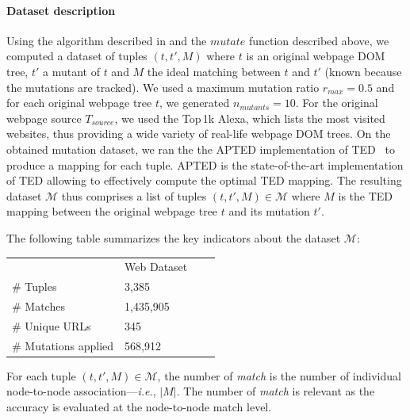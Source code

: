 \documentclass{vldb}
\begin{document}
\paragraph{Dataset description}
Using the algorithm described in  and the $mutate$ function described above, we computed a dataset of tuples $(t, t', M)$ where $t$ is an original webpage DOM tree, $t'$ a mutant of $t$ and $M$ the ideal matching between $t$ and $t'$ (known because the mutations are tracked).
We used a maximum mutation ratio $r_{max} = 0.5$ and for each original webpage tree $t$, we generated $n_{mutants}=10$.
For the original webpage source $T_{source}$, we used the Top\,1k Alexa, which lists the most visited websites, thus providing a wide variety of real-life webpage DOM trees.
On the obtained mutation dataset, we ran the the APTED implementation of TED~\cite{pawlik2016tree} to produce a mapping for each tuple.
APTED is the state-of-the-art implementation of TED allowing to  effectively compute the optimal TED mapping.
The resulting dataset $\mathscr{M}$ thus comprises a list of tuples $(t, t', M) \in \mathscr{M}$ where $M$ is the TED mapping between the original webpage tree $t$ and its mutation $t'$.

The following table summarizes the key indicators about the dataset $\mathscr{M}$:
\begin{table}[h]
\centering
\begin{tabular}{l|l|ll}
\cline{2-2}
                                           & Web Dataset  &  &  \\ 
\cline{1-2}
\multicolumn{1}{|l|}{\# Tuples}            &        3,385 &  &  \\
\multicolumn{1}{|l|}{\# Matches}           &    1,435,905 &  &  \\
\multicolumn{1}{|l|}{\# Unique URLs}       &          345 &  &  \\
\multicolumn{1}{|l|}{\# Mutations applied} &      568,912 &  &  \\ 
\cline{1-2}
\end{tabular}
\end{table}
For each tuple $(t, t', M) \in \mathscr{M}$, the number of \textit{match} is the number of individual node-to-node association---\emph{i.e.}, $|M|$. The number of \textit{match} is relevant as the accuracy is evaluated at the node-to-node match level.
\end{document}
